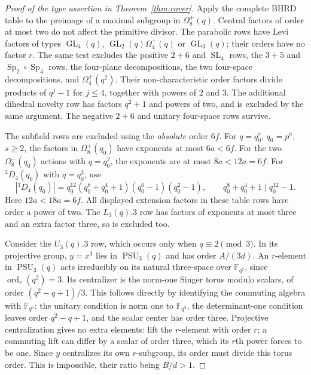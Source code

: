 \documentclass[11pt]{article}
\newcommand{\F}{\mathbb F}\newcommand{\Om}{\Omega}\newcommand{\PGU}{\operatorname{PGU}}\newcommand{\GL}{\operatorname{GL}}\newcommand{\End}{\operatorname{End}}\newcommand{\PSU}{\operatorname{PSU}}
\begin{document}
\begin{proof}[Proof of the type assertion in Theorem~\ref{thm:cover}]
Apply the complete BHRD table to the preimage of a maximal subgroup in
$\Om_8^+(q)$. Central factors of order at most two do not affect the
primitive divisor. The parabolic rows have Levi factors of types
$\GL_4(q)$, $\GL_2(q)\Om_4^+(q)$ or $\GL_3(q)$; their orders have no
factor $r$. The same test excludes the positive $2+6$ and $\operatorname{SL}_4$
rows, the $3+5$ and $\operatorname{Sp}_2\circ\operatorname{Sp}_4$ rows,
the four-plane decompositions, the two four-space decompositions, and
$\Om_4^+(q^2)$. Their non-characteristic order factors divide products of
$q^j-1$ for $j\le4$, together with powers of $2$ and $3$.
The additional dihedral novelty row has factors $q^2+1$ and powers of two,
and is excluded by the same argument.
The negative $2+6$ and unitary four-space rows survive.

The subfield rows are excluded using the \emph{absolute} order $6f$.
For $q=q_0^s$, $q_0=p^a$, $s\ge2$, the factors in $\Om_8^+(q_0)$
have exponents at most $6a<6f$.
For the two $\Om_8^-(q_0)$ actions with $q=q_0^2$, the exponents are
at most $8a<12a=6f$.
For ${}^3D_4(q_0)$ with $q=q_0^3$, use
\[
 |{}^3D_4(q_0)|=q_0^{12}(q_0^8+q_0^4+1)(q_0^6-1)(q_0^2-1),
 \qquad q_0^8+q_0^4+1\mid q_0^{12}-1.
\]
Here $12a<18a=6f$. All displayed extension factors in these table rows
have order a power of two. The $L_3(q).3$ row has factors of exponents
at most three and an extra factor three, so is excluded too.

Consider the $U_3(q).3$ row, which occurs only when $q\equiv2\pmod3$.
In its projective group, $y=x^3$ lies in $\PSU_3(q)$ and has order
$A/(3d)$. An $r$-element in $\PSU_3(q)$ acts irreducibly on its natural
three-space over $\F_{q^2}$, since $\operatorname{ord}_r(q^2)=3$.
Its centralizer is the norm-one Singer torus modulo scalars, of order
$(q^2-q+1)/3$. This follows directly by identifying the commuting
algebra with $\F_{q^6}$: the unitary condition is norm one to
$\F_{q^3}$, the determinant-one condition leaves order $q^2-q+1$,
and the scalar center has order three. Projective centralization gives no
extra elements: lift the $r$-element with order $r$; a commuting lift
can differ by a scalar of order three, which its $r$th power forces to be one.
Since $y$ centralizes its own $r$-subgroup, its order must divide this torus
order. This is impossible, their ratio being $B/d>1$.


\end{proof}
\end{document}
